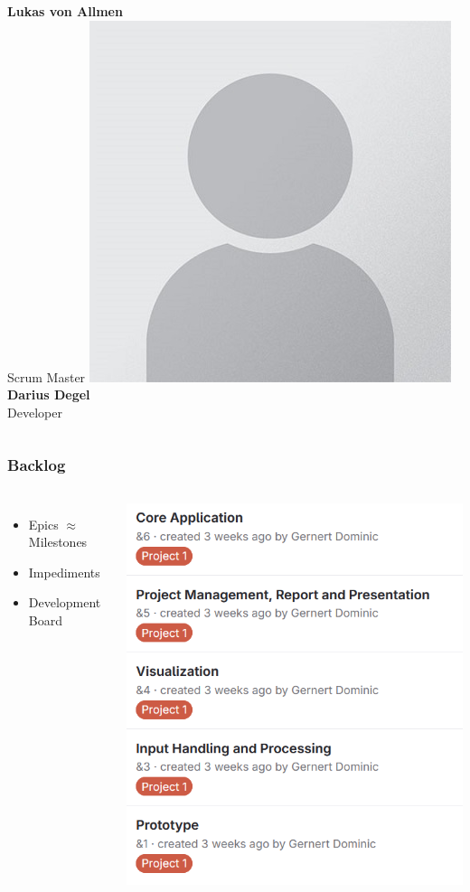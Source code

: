 \begin{frame}
\begin{columns}
        \textbf{Lukas von Allmen} \\ \small{Scrum Master}
        \centering
        \includegraphics[width=0.45\linewidth]{../assets/avatar_placeholder.jpg} \\
        \textbf{Darius Degel} \\ \small{Developer}
\end{columns}
\end{frame}

\begin{frame}
    \frametitle{Backlog}
    \begin{columns}
        \begin{itemize}
            \large
            \item Epics \ensuremath{\approx} Milestones
            \item Impediments
            \item Development Board
        \end{itemize}
        \includegraphics[width=0.8\linewidth]{../assets/epics_interim_presentation.png}
    \end{columns}
\end{frame}


